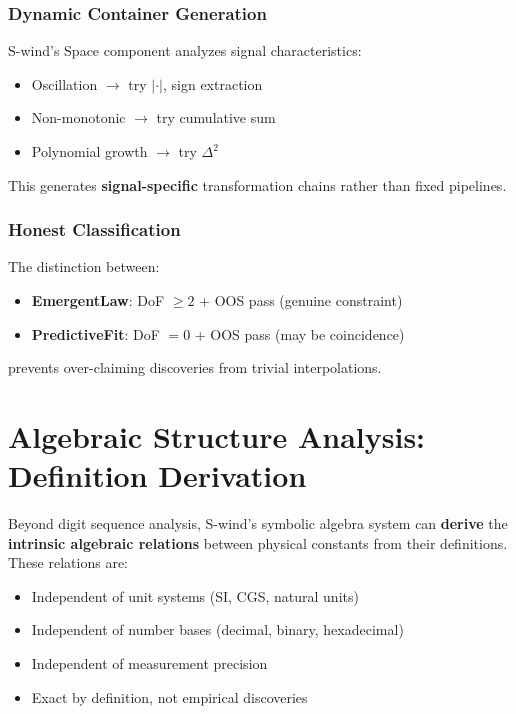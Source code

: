 \documentclass[twocolumn,showpacs,preprintnumbers,amsmath,amssymb,prl]{revtex4-2}
\begin{document}
\subsubsection{Dynamic Container Generation}

S-wind's Space component analyzes signal characteristics:
\begin{itemize}
    \item Oscillation $\to$ try $|\cdot|$, sign extraction
    \item Non-monotonic $\to$ try cumulative sum
    \item Polynomial growth $\to$ try $\Delta^2$
\end{itemize}

This generates \textbf{signal-specific} transformation chains rather than fixed pipelines.

\subsubsection{Honest Classification}

The distinction between:
\begin{itemize}
    \item \textbf{EmergentLaw}: DoF $\geq 2$ + OOS pass (genuine constraint)
    \item \textbf{PredictiveFit}: DoF $= 0$ + OOS pass (may be coincidence)
\end{itemize}

prevents over-claiming discoveries from trivial interpolations.

\section{Algebraic Structure Analysis: Definition Derivation}

Beyond digit sequence analysis, S-wind's symbolic algebra system can \textbf{derive} the \textbf{intrinsic algebraic relations} between physical constants from their definitions. These relations are:
\begin{itemize}
    \item Independent of unit systems (SI, CGS, natural units)
    \item Independent of number bases (decimal, binary, hexadecimal)
    \item Independent of measurement precision
    \item Exact by definition, not empirical discoveries
\end{itemize}
\end{document}
